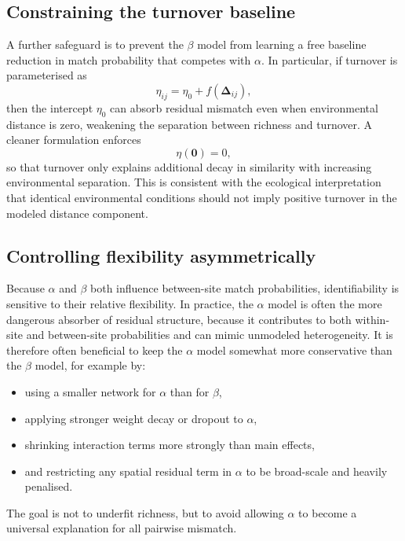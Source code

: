 \documentclass{article}
\begin{document}
\subsection{Constraining the turnover baseline}

A further safeguard is to prevent the \(\beta\) model from learning a free baseline reduction in match probability that competes with \(\alpha\). In particular, if turnover is parameterised as
\begin{equation}
    \eta_{ij} = \eta_0 + f(\bm{\Delta}_{ij}),
\end{equation}
then the intercept \(\eta_0\) can absorb residual mismatch even when environmental distance is zero, weakening the separation between richness and turnover. A cleaner formulation enforces
\begin{equation}
    \eta(\mathbf 0) = 0,
\end{equation}
so that turnover only explains additional decay in similarity with increasing environmental separation. This is consistent with the ecological interpretation that identical environmental conditions should not imply positive turnover in the modeled distance component.

\subsection{Controlling flexibility asymmetrically}

Because \(\alpha\) and \(\beta\) both influence between-site match probabilities, identifiability is sensitive to their relative flexibility. In practice, the \(\alpha\) model is often the more dangerous absorber of residual structure, because it contributes to both within-site and between-site probabilities and can mimic unmodeled heterogeneity. It is therefore often beneficial to keep the \(\alpha\) model somewhat more conservative than the \(\beta\) model, for example by:
\begin{itemize}
    \item using a smaller network for \(\alpha\) than for \(\beta\),
    \item applying stronger weight decay or dropout to \(\alpha\),
    \item shrinking interaction terms more strongly than main effects,
    \item and restricting any spatial residual term in \(\alpha\) to be broad-scale and heavily penalised.
\end{itemize}
The goal is not to underfit richness, but to avoid allowing \(\alpha\) to become a universal explanation for all pairwise mismatch.
\end{document}
